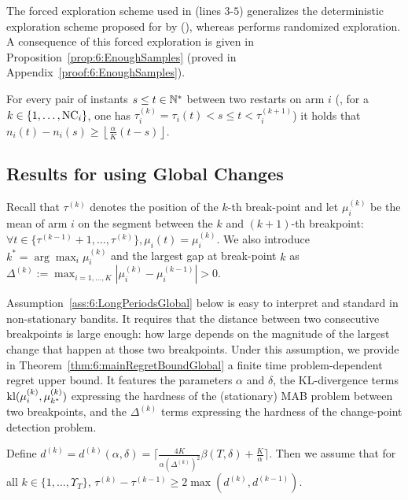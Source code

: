 The forced exploration scheme used in \GLRklUCB{} (lines $3$-$5$) generalizes the deterministic exploration scheme proposed for \MUCB{} by (\cite{CaoZhenKvetonXie18}), whereas \CUSUMUCB{} performs randomized exploration.
A consequence of this forced exploration is given in Proposition~\ref{prop:6:EnoughSamples} (proved in Appendix~\ref{proof:6:EnoughSamples}).

\begin{proposition}\label{prop:6:EnoughSamples}
    For every pair of instants $s \leq t\in\mathbb{N}^*$ between two restarts on arm $i$ (\ie, for a $k\in\{1,\dots,\text{NC}_i\}$, one has $\tau_i^{(k)} = \tau_i(t) < s \leq t < \tau_i^{(k+1)}$) it holds that $n_i(t) - n_i(s) \geq \left\lfloor \frac{\alpha}{K} (t-s) \right\rfloor$.
\end{proposition}


\subsection{Results for \GLRklUCB{} using Global Changes}

Recall that $\tau^{(k)}$ denotes the position of the $k$-th break-point and let $\mu_i^{(k)}$ be the mean of arm $i$ on the segment between the $k$ and $(k+1)$-th breakpoint:
$\forall t \in \{ \tau^{(k-1)}+1, \dots, \tau^{(k)} \}, \mu_{i}(t) = \mu_i^{(k)}$. We also introduce $k^* = \arg\max_i \mu_i^{(k)} $ and the largest gap at break-point $k$ as $\Delta^{(k)} := \max_{i=1,\dots,K} |\mu_i^{(k)} - \mu_i^{(k-1)}| >0$.

Assumption~\ref{ass:6:LongPeriodsGlobal} below is easy to interpret and standard in non-stationary bandits. It requires that the distance between two consecutive breakpoints is large enough: how large depends on the magnitude of the largest change that happen at those two breakpoints.
Under this assumption, we provide in Theorem~\ref{thm:6:mainRegretBoundGlobal} a finite time problem-dependent regret upper bound.
It features the parameters $\alpha$ and $\delta$,
the KL-divergence terms $\mathrm{kl}(\mu_{i}^{(k)},\mu_{k^*}^{(k)})$ expressing the hardness of the (stationary) MAB problem between two breakpoints,
and the $\Delta^{(k)}$ terms expressing the hardness of the change-point detection problem.


\begin{assumption}\label{ass:6:LongPeriodsGlobal}
    Define
    $
        d^{(k)} = d^{(k)}(\alpha,\delta) = \lceil \frac{4K}{\alpha\left(\Delta^{(k)}\right)^2}\beta(T,\delta) + \frac{K}{\alpha} \rceil.
    $
    Then we assume that for all $k \in \{1,\dots,\Upsilon_T\}$,
    $\tau^{(k)} - \tau^{(k-1)} \geq 2\max (d^{(k)},d^{(k-1)})$.
\end{assumption}


